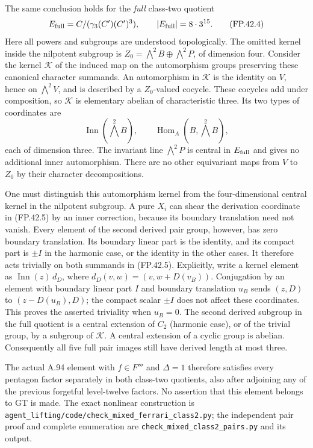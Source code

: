 The same conclusion holds for the \emph{full} class-two
quotient
\[
 E_{\rm full}=C/(\gamma_3(C')(C')^3),
       \qquad |E_{\rm full}|=8\cdot3^{15}.
 \tag{FP.42.4}
\]
Here all powers and subgroups are understood topologically.
The omitted kernel inside the nilpotent subgroup is
$Z_0=\bigwedge^2B\oplus\bigwedge^2P$, of dimension four.
Consider the kernel $\mathcal K$ of the induced map on the
automorphism groups preserving these canonical character
summands. An automorphism in $\mathcal K$ is the identity on
$V$, hence on $\bigwedge^2V$, and is described by a
$Z_0$-valued cocycle. These cocycles add under composition,
so $\mathcal K$ is elementary abelian of characteristic three.
Its two types of coordinates are
\[
 \operatorname{Inn}(\bigwedge^2B),\qquad
 \operatorname{Hom}_A(B,\bigwedge^2B),
 \tag{FP.42.5}
\]
each of dimension three. The invariant line
$\bigwedge^2P$ is central in $E_{\rm full}$ and gives no
additional inner automorphism. There are no other equivariant
maps from $V$ to $Z_0$ by their character decompositions.

One must distinguish this automorphism kernel from the
four-dimensional central kernel in the nilpotent subgroup.
A pure $X_i$ can shear the derivation coordinate in (FP.42.5)
by an inner correction, because its boundary translation need
not vanish. Every element of the second derived pair group,
however, has zero boundary translation. Its boundary linear
part is the identity, and its compact part is $\pm I$ in the
harmonic case, or the identity in the other cases.
It therefore acts trivially on both summands in (FP.42.5).
Explicitly, write a kernel element as
$\operatorname{Inn}(z)\,d_D$, where
$d_D(v,w)=(v,w+D(v_B))$. Conjugation by an element with
boundary linear part $I$ and boundary translation $u_B$
sends $(z,D)$ to $(z-D(u_B),D)$; the compact scalar $\pm I$
does not affect these coordinates. This proves the asserted
triviality when $u_B=0$.
The second derived subgroup in the full quotient is a central
extension of $C_2$ (harmonic case), or of the trivial group,
by a subgroup of $\mathcal K$. A central extension of a cyclic
group is abelian. Consequently all five full pair images still
have derived length at most three.

The actual A.94 element with $f\in F'''$ and $\Delta=1$
therefore satisfies every pentagon factor separately in both
class-two quotients, also after adjoining any of the previous
forgetful level-twelve factors. No assertion that this element
belongs to GT is made. The exact nonlinear construction is
\texttt{agent\_lifting/code/check\_mixed\_ferrari\_class2.py};
the independent pair proof and complete enumeration are
\texttt{check\_mixed\_class2\_pairs.py} and its output.

